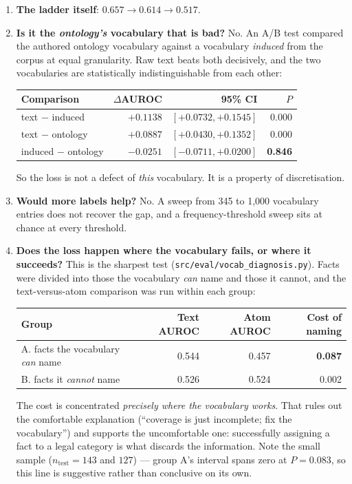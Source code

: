 \documentclass[12pt,a4paper]{article}
\newcommand{\code}[1]{\texttt{\small #1}}
\begin{document}
\begin{enumerate}
\item \textbf{The ladder itself}: $0.657 \rightarrow 0.614 \rightarrow 0.517$.

\item \textbf{Is it the \emph{ontology's} vocabulary that is bad?} No. An A/B test compared the
authored ontology vocabulary against a vocabulary \emph{induced} from the corpus at equal
granularity. Raw text beats both decisively, and the two vocabularies are statistically
indistinguishable from each other:
\begin{center}
\begin{tabular}{@{}lrrr@{}}
\toprule
\textbf{Comparison} & \textbf{$\Delta$AUROC} & \textbf{95\% CI} & \textbf{$P$} \\
\midrule
text $-$ induced   & $+0.1138$ & $[+0.0732, +0.1545]$ & 0.000 \\
text $-$ ontology  & $+0.0887$ & $[+0.0430, +0.1352]$ & 0.000 \\
induced $-$ ontology & $-0.0251$ & $[-0.0711, +0.0200]$ & \textbf{0.846} \\
\bottomrule
\end{tabular}
\end{center}
So the loss is not a defect of \emph{this} vocabulary. It is a property of discretisation.

\item \textbf{Would more labels help?} No. A sweep from 345 to 1,000 vocabulary entries does not
recover the gap, and a frequency-threshold sweep sits at chance at every threshold.

\item \textbf{Does the loss happen where the vocabulary fails, or where it succeeds?} This is the
sharpest test (\code{src/eval/vocab\_diagnosis.py}). Facts were divided into those the vocabulary
\emph{can} name and those it cannot, and the text-versus-atom comparison was run within each group:
\begin{center}
\begin{tabular}{@{}lrrr@{}}
\toprule
\textbf{Group} & \textbf{Text AUROC} & \textbf{Atom AUROC} & \textbf{Cost of naming} \\
\midrule
A. facts the vocabulary \emph{can} name    & 0.544 & 0.457 & \textbf{0.087} \\
B. facts it \emph{cannot} name             & 0.526 & 0.524 & 0.002 \\
\bottomrule
\end{tabular}
\end{center}
The cost is concentrated \emph{precisely where the vocabulary works}. That rules out the comfortable
explanation (``coverage is just incomplete; fix the vocabulary'') and supports the uncomfortable one:
successfully assigning a fact to a legal category is what discards the information. Note the small
sample ($n_{\text{test}}=143$ and $127$) --- group A's interval spans zero at $P=0.083$, so this
line is suggestive rather than conclusive on its own.


\end{enumerate}
\end{document}

